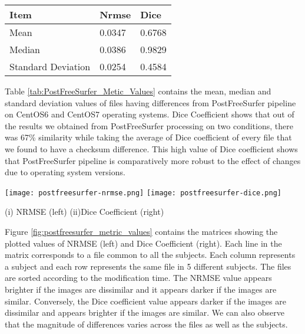 \begin{center}
\begin{tabular}{|l|l|l|}
\hline
\textbf{Item}      & \textbf{Nrmse} & \textbf{Dice} \\ \hline
Mean               & 0.0347     & 0.6768   \\ \hline
Median             & 0.0386    & 0.9829   \\ \hline
Standard Deviation & 0.0254    & 0.4584   \\ \hline
\end{tabular}
\label{tab:PostFreeSurfer_Metic_Values}
\end{center}

Table \ref{tab:PostFreeSurfer_Metic_Values} contains the mean, median and standard deviation values of files having differences from PostFreeSurfer pipeline on CentOS6 and CentOS7 operating systems. Dice Coefficient shows that out of the results we obtained from PostFreeSurfer processing on two conditions, there was 67\% similarity while taking the average of Dice coefficient of every file that we found to have a checksum difference. This high value of Dice coefficient shows that PostFreeSurfer pipeline is comparatively more robust to the effect of changes due to operating system versions.

\begin{center}
\texttt{[image: postfreesurfer-nrmse.png]}%
\texttt{[image: postfreesurfer-dice.png]}
\caption*{(i) NRMSE (left) (ii)Dice Coefficient (right)}
\label{fig:postfreesurfer_metric_values}
\end{center}

Figure \ref{fig:postfreesurfer_metric_values} contains the matrices showing the plotted values of NRMSE (left) and Dice Coefficient (right). Each line in the matrix corresponds to a file common to all the subjects. Each column represents a subject and each row represents the same file in 5 different subjects. The files are sorted according to the modification time. The NRMSE value appears brighter if the images are dissimilar and it appears darker if the images are similar. Conversely, the Dice coefficient value appears darker if the images are dissimilar and appears brighter if the images are similar. We can also observe that the magnitude of differences varies across the files as well as the subjects.

